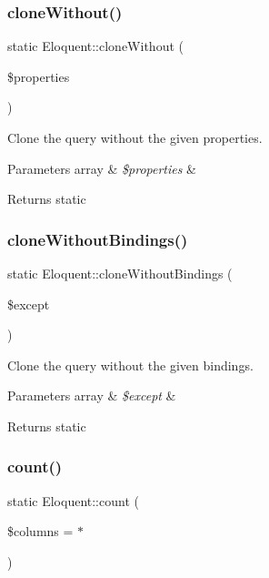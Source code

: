 \subsubsection{\texorpdfstring{clone\+Without()}{cloneWithout()}}
{\footnotesize\ttfamily static Eloquent\+::clone\+Without (\begin{DoxyParamCaption}\item[{}]{\$properties }\end{DoxyParamCaption})\hspace{0.3cm}{\ttfamily [static]}}

Clone the query without the given properties.


\begin{DoxyParams}[1]{Parameters}
array & {\em \$properties} & \\
\hline
\end{DoxyParams}
\begin{DoxyReturn}{Returns}
static 
\end{DoxyReturn}
\mbox{\label{class_eloquent_a3794141227f450194be39fe46372cfa3}} 
\subsubsection{\texorpdfstring{clone\+Without\+Bindings()}{cloneWithoutBindings()}}
{\footnotesize\ttfamily static Eloquent\+::clone\+Without\+Bindings (\begin{DoxyParamCaption}\item[{}]{\$except }\end{DoxyParamCaption})\hspace{0.3cm}{\ttfamily [static]}}

Clone the query without the given bindings.


\begin{DoxyParams}[1]{Parameters}
array & {\em \$except} & \\
\hline
\end{DoxyParams}
\begin{DoxyReturn}{Returns}
static 
\end{DoxyReturn}
\mbox{\label{class_eloquent_af7f114e287681eb2333c97d6bf26285d}} 
\subsubsection{\texorpdfstring{count()}{count()}}
{\footnotesize\ttfamily static Eloquent\+::count (\begin{DoxyParamCaption}\item[{}]{\$columns = {\ttfamily \textquotesingle{}$\ast$\textquotesingle{}} }\end{DoxyParamCaption})\hspace{0.3cm}{\ttfamily [static]}}

